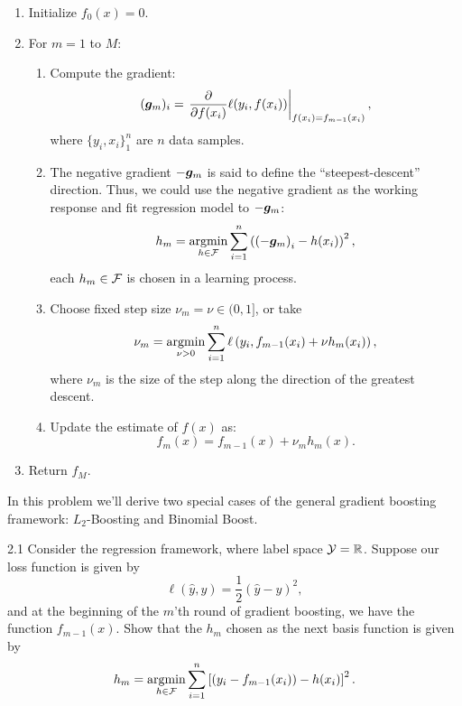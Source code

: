 \documentclass{article}
\begin{document}
\begin{enumerate}
  \item Initialize $f_{0}(x)=0$. 
  \item For $m=1$ to $M$:

  \begin{enumerate}
    \item Compute the gradient: 
    \begin{equation}
      ({\bm{g}}_{m})_i=\left.\frac{\partial}{\partial f(x_{i})}\ell(y_{i},f(x_{i})) \right|_{f(x_{i})=f_{m-1}(x_{i})},
    \end{equation}
    where $\{y_i, x_i\}_{1}^{n}$ are $n$ data samples.
    \item The negative gradient $-{\bm{g}}_{m}$ is said to define the ``steepest-descent'' direction. Thus, we could use the negative gradient as the working response and fit regression model to $-{\bm{g}}_{m}$: 
    \begin{equation}
      h_{m}=\operatorname*{argmin}_{h\in\mathcal{F}}\sum_{i=1}^{n}\left(\left(-{\bm{g}}_{m}\right)_{i}-h(x_{i})\right)^{2},
    \end{equation}
    each $h_m \in \mathcal{F}$ is chosen in a learning process.

    \item Choose fixed step size $\nu_{m}=\nu\in(0,1]$, or take 
    \begin{equation}
      \nu_{m}=\operatorname*{argmin}_{\nu>0}\sum_{i=1}^{n}\ell\left( y_{i},f_{m-1}(x_{i})+\nu h_{m}(x_{i})\right) ,
    \end{equation}
    where $\nu_{m}$ is the size of the step along the direction of the greatest descent.

    \item Update the estimate of $f(x)$ as: 
    \begin{equation}
      f_{m}(x)=f_{m-1}(x)+\nu_{m}h_{m}(x).
    \end{equation}
  \end{enumerate}
  \item Return $f_{M}$. 
\end{enumerate}

In this problem we'll derive two special cases of the general gradient boosting framework: $L_{2}$-Boosting and Binomial Boost. 

2.1 Consider the regression framework, where label space $\mathcal{Y}=\mathbb{R}$. Suppose our loss function is given by 
\begin{equation}
  \ell(\hat{y},y)=\frac{1}{2}\left(\hat{y}-y\right)^{2},
\end{equation}
and at the beginning of the $m$'th round of gradient boosting, we have the function $f_{m-1}(x)$. Show that the $h_{m}$ chosen as the next basis function is given by 
\begin{equation}
  h_{m}=\operatorname*{argmin}_{h\in\mathcal{F}}\sum_{i=1}^{n}\left[\left(y_{i}-f_{m-1}(x_{i})\right)-h(x_{i})\right]^{2}.
\end{equation}
\end{document}
